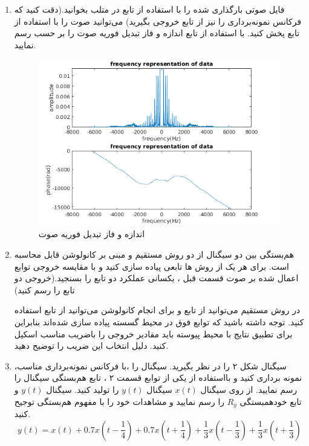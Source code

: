 \documentclass[14pt, professionalfont]{article}
\begin{document}
	
	\begin{enumerate}
	\item
	فایل صوتی بارگذاری شده را با استفاده از تابع
	\:
	\:
	 در متلب بخوانید.(دقت کنید که فرکانس نمونه‌برداری را نیز از تابع خروجی بگیرید) می‌توانید صوت را با استفاده از تابع
	\:
	\:
	پخش کنید. با استفاده از تابع 
	\:
	\:
	 اندازه و فاز تبدیل فوریه صوت را بر حسب 
	\:
	\:
	رسم نمایید.
		\begin{figure}[h]
		\centering
		\includegraphics[scale = 0.30]{../images/fourier_of_sound.png}
		\caption{اندازه و فاز تبدیل فوریه صوت}
		\end{figure}
	\item 
	هم‌بستگی بین دو سیگنال از دو روش مستقیم و مبنی بر کانولوشن قابل محاسبه است. برای هر یک از روش ها تابعی پیاده سازی کنید و با مقایسه خروجی توابع اعمال شده بر صوت قسمت قبل ، یکسانی  عملکرد دو تابع را بسنجید.(خروجی دو تابع را رسم کنید)
	
	در روش مستقیم می‌توانید از تابع 
	\:
	\:
	 و برای انجام کانولوشن می‌توانید از تابع
	\:
	\:
	استفاده کنید. توجه داشته باشید که توابع فوق در محیط گسسته پیاده سازی شده‌اند بنابر‌این برای تطبیق نتایج با محیط پیوسته باید مقادیر خروجی را باضریب مناسب اسکیل کنید. دلیل انتخاب این ضریب را توضیح دهید.
	
	\item 
	سیگنال شکل ۲ را در نظر بگیرید. سیگنال را ،با فرکانس نمونه‌برداری مناسب، نمونه برداری کنید و با‌استفاده از یکی از توابع قسمت ۲ ، تابع هم‌بستگی سیگنال را رسم نمایید. از روی سیگنال 
	$x(t)$
	سیگنال 	
	$y(t)$
	 را تولید کنید. سیگنال $y(t)$
	  و تابع خودهمبستگی $R_y$ را رسم نمایید و مشاهدات خود را با مفهوم هم‌بستگی توجیح کنید.
	  	$$y(t) = x(t) + 0.7x(t-\frac{1}{4}) + 0.7x(t+\frac{1}{4}) + \frac{1}{3}x(t-\frac{1}{3}) +‌
	  \frac{1}{3}x(t+\frac{1}{3})$$
	  

\end{enumerate}
\end{document}
